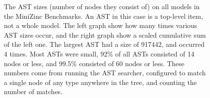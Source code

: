 \begin{figure}[ht]
  \centering
  \hfill%
  \caption{The AST sizes (number of nodes they consist of) on all models in the MiniZinc
    Benchmarks. An AST in this case is a top-level item, not a whole model. The left graph
    show how many times various AST sizes occur, and the right graph show a scaled
    cumulative sum of the left one. The largest AST had a size of 917442, and occurred 4
    times. Most ASTs were small, 92\% of all ASTs consisted of 14 nodes or less, and
    99.5\% consisted of 60 nodes or less. These numbers come from running the AST
    searcher, configured to match a single node of any type anywhere in the tree, and
    counting the number of matches.}%
  \label{fig:ast:counts}
\end{figure}
